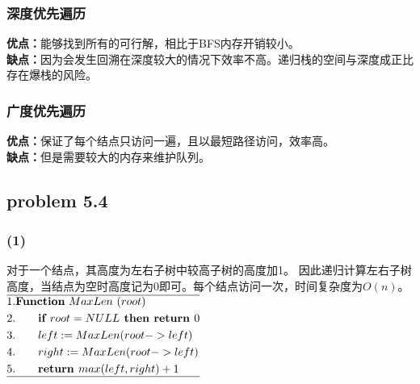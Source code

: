 \documentclass[11pt,a4paper,oneside,oldfontcommands]{ctexart}
\begin{document}
\subsubsection*{深度优先遍历}
\noindent \textbf{优点：}能够找到所有的可行解，相比于BFS内存开销较小。\\
\textbf{缺点：}因为会发生回溯在深度较大的情况下效率不高。递归栈的空间与深度成正比存在爆栈的风险。
\subsubsection*{广度优先遍历}
\noindent\textbf{优点：}保证了每个结点只访问一遍，且以最短路径访问，效率高。\\
\textbf{缺点：}但是需要较大的内存来维护队列。
{\subsection*{problem 5.4}}
\subsubsection*{(1)}
\noindent 对于一个结点，其高度为左右子树中较高子树的高度加1。
因此递归计算左右子树高度，当结点为空时高度记为0即可。每个结点访问一次，时间复杂度为$O(n)$。\\
$
	\begin{aligned}
		\hline
		 & 1.\textbf{Function}\ {MaxLen}\ (root)                        \\
		 & 2.\hspace*{20pt}\textbf{if }root=NULL\textbf{ then return }0 \\
		 & 3.\hspace*{20pt}left:=MaxLen(root->left)                     \\
		 & 4.\hspace*{20pt}right:=MaxLen(root->left)                    \\
		 & 5.\hspace*{20pt}\textbf{return }max(left,right)+1            \\
		\hline
	\end{aligned}
$
\end{document}
